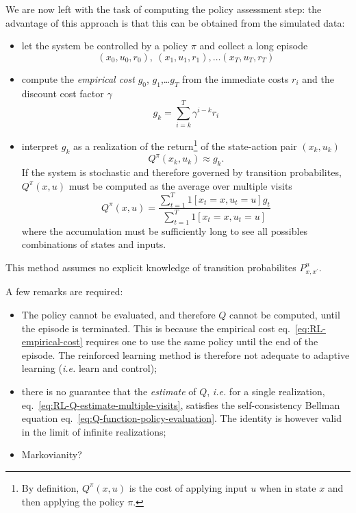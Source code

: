 We are now left with the task of computing the policy assessment step: the advantage of this approach is that this can be obtained from the simulated data:
\begin{itemize}
\item let the system be controlled by a policy $\pi$ and collect a long episode
  \begin{equation*}
    (x_0,u_0,r_0),\ (x_1,u_1,r_1),\ldots (x_T,u_T,r_T)
  \end{equation*}
\item compute the \emph{empirical cost} $g_0$, $g_1$,\ldots $g_T$ from the immediate costs $r_i$ and the discount cost factor $\gamma$
  \begin{equation}
    \label{eq:RL-empirical-cost}
    g_k = \sum_{i=k}^T \gamma^{i-k}r_i
  \end{equation}
\item interpret $g_k$ as a realization of the return\footnote{By definition, $Q^\pi(x,u)$ is the cost of applying input $u$ when in state $x$ and then applying the policy $\pi$.} of the state-action pair $(x_k,u_k)$
  \begin{equation*}
    Q^\pi(x_k,u_k) \approx g_k.
  \end{equation*}
  If the system is stochastic and therefore governed by transition probabilites, $Q^\pi(x,u)$ must be computed as the average over multiple visits
  \begin{equation}
    \label{eq:RL-Q-estimate-multiple-visits}
    Q^\pi(x,u) = \frac{\sum_{t=1}^T 1[x_t=x,u_t=u]g_t}{\sum_{t=1}^T 1[x_t=x,u_t=u]}
  \end{equation}
  where the accumulation must be sufficiently long to see all possibles combinations of states and inputs.
\end{itemize}
This method assumes no explicit knowledge of transition probabilites $P_{x,x^\prime}^u$.

A few remarks are required:
\begin{itemize}
\item The policy cannot be evaluated, and therefore $Q$ cannot be computed, until the episode is terminated. This is because the empirical cost eq.~\eqref{eq:RL-empirical-cost} requires one to use the same policy until the end of the episode. The reinforced learning method is therefore not adequate to adaptive learning (\textit{i.e.} learn and control);
\item there is no guarantee that the \emph{estimate} of $Q$, \textit{i.e.} for a single realization, eq.~\eqref{eq:RL-Q-estimate-multiple-visits}, satisfies the self-consistency Bellman equation eq.~\eqref{eq:Q-function-policy-evaluation}. The identity is however valid in the limit of infinite realizations;
\item Markovianity?
\end{itemize}

